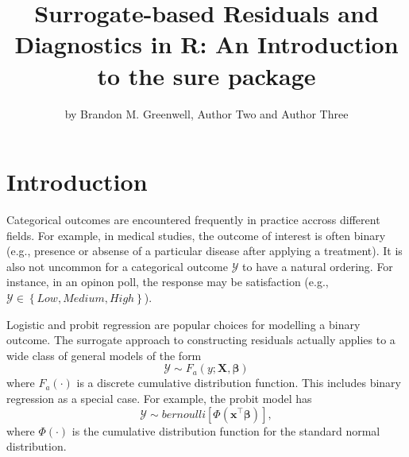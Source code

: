 \title{Surrogate-based Residuals and Diagnostics in R: An Introduction to the sure package}
\author{by Brandon M. Greenwell, Author Two and Author Three}

\maketitle



\section{Introduction}

Categorical outcomes are encountered frequently in practice accross different fields. For example, in medical studies, the outcome of interest is often binary (e.g., presence or absense of a particular disease after applying a treatment). It is also not uncommon for a categorical outcome $\mathcal{Y}$ to have a natural ordering. For instance, in an opinon poll, the response may be satisfaction (e.g., $\mathcal{Y} \in \left\{Low, Medium, High\right\}$).

Logistic and probit regression are popular choices for modelling a binary outcome. The surrogate approach to constructing residuals actually applies to a wide class of general models of the form 
\begin{equation*}
  \mathcal{Y} \sim F_a\left(y; \boldsymbol{X}, \boldsymbol{\beta}\right)
\end{equation*}
where $F_a\left(\cdot\right)$ is a discrete cumulative distribution function. This includes binary regression as a special case. For example, the probit model has
\begin{equation*}
  \mathcal{Y} \sim bernoulli\left[\Phi\left(\boldsymbol{x}^\top\boldsymbol{\beta}\right)\right],
\end{equation*}
where $\Phi\left(\cdot\right)$ is the cumulative distribution function for the standard normal distribution.

